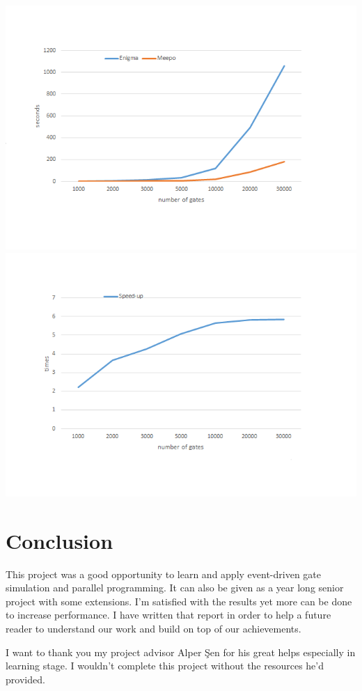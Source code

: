 \documentclass[a4paper,onesided,12pt]{report}
\begin{document}
\includegraphics[height=0.45\textheight]{graph1.png} 
\includegraphics[height=0.45\textheight]{graph2.png} 

\chapter{Conclusion}

This project was a good opportunity to learn and apply event-driven gate simulation and parallel programming. It can also be given as a year long senior project with some extensions. I'm satisfied with the results yet more can be done to increase performance. I have written that report in order to help a future reader to understand our work and build on top of our achievements.

I want to thank you my project advisor Alper Şen for his great helps especially in learning stage. I wouldn't complete this project without the resources  he'd provided.
\end{document}
